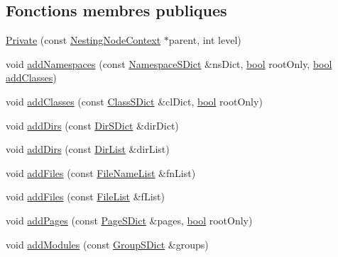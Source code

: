 \subsection*{Fonctions membres publiques}
\begin{DoxyCompactItemize}
\item 
\hyperlink{class_nesting_context_1_1_private_a06db2c4640ba5fa80ba2905e95297a77}{Private} (const \hyperlink{class_nesting_node_context}{Nesting\+Node\+Context} $\ast$parent, int level)
\item 
void \hyperlink{class_nesting_context_1_1_private_abdb93dd1c46045710a4faef55e9121fd}{add\+Namespaces} (const \hyperlink{class_namespace_s_dict}{Namespace\+S\+Dict} \&ns\+Dict, \hyperlink{qglobal_8h_a1062901a7428fdd9c7f180f5e01ea056}{bool} root\+Only, \hyperlink{qglobal_8h_a1062901a7428fdd9c7f180f5e01ea056}{bool} \hyperlink{class_nesting_context_1_1_private_a75ae365ff6c6cfb143d865d07c380440}{add\+Classes})
\item 
void \hyperlink{class_nesting_context_1_1_private_a75ae365ff6c6cfb143d865d07c380440}{add\+Classes} (const \hyperlink{class_class_s_dict}{Class\+S\+Dict} \&cl\+Dict, \hyperlink{qglobal_8h_a1062901a7428fdd9c7f180f5e01ea056}{bool} root\+Only)
\item 
void \hyperlink{class_nesting_context_1_1_private_a6c44584d0dfc175ba2220c33813cbd32}{add\+Dirs} (const \hyperlink{class_dir_s_dict}{Dir\+S\+Dict} \&dir\+Dict)
\item 
void \hyperlink{class_nesting_context_1_1_private_a09745a4c8ba02a69f0b79fdfb204abcd}{add\+Dirs} (const \hyperlink{class_dir_list}{Dir\+List} \&dir\+List)
\item 
void \hyperlink{class_nesting_context_1_1_private_a2533e79fd50dca33e031011f141c2894}{add\+Files} (const \hyperlink{class_file_name_list}{File\+Name\+List} \&fn\+List)
\item 
void \hyperlink{class_nesting_context_1_1_private_afd0b8ef6db6e2d988e8f3c9dc0d30cc0}{add\+Files} (const \hyperlink{class_file_list}{File\+List} \&f\+List)
\item 
void \hyperlink{class_nesting_context_1_1_private_a8d5958dc1738ef02fbe7e915a333d153}{add\+Pages} (const \hyperlink{class_page_s_dict}{Page\+S\+Dict} \&pages, \hyperlink{qglobal_8h_a1062901a7428fdd9c7f180f5e01ea056}{bool} root\+Only)
\item 
void \hyperlink{class_nesting_context_1_1_private_a5f18894433df57981b5d7cdc1188f18e}{add\+Modules} (const \hyperlink{class_group_s_dict}{Group\+S\+Dict} \&groups)
\item 

\end{DoxyCompactItemize}
